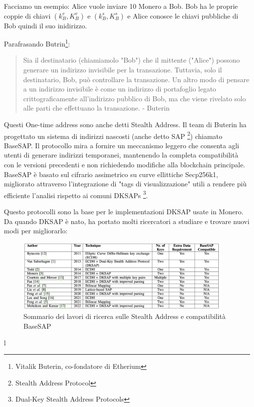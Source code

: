 \documentclass[12pt,a4paper]{article}
\begin{document}
Facciamo un esempio: Alice vuole inviare 10 Monero a Bob. Bob ha le proprie
coppie di chiavi $(k^v_B, K^v_B)$ e $(k^s_B, K^s_B)$ e Alice conosce le chiavi
pubbliche di Bob quindi il suo inidirizzo.

Parafrasando Butrin\footnote{Vitalik Buterin, co-fondatore di Etherium}:
\begin{quote}
    Sia il destinatario (chiamiamolo "Bob") che il mittente ("Alice") possono
    generare un indirizzo invisibile per la transazione. Tuttavia, solo il
    destinatario, Bob, può controllare la transazione. Un altro modo di pensare
    a un indirizzo invisibile è come un indirizzo di portafoglio legato
    crittograficamente all’indirizzo pubblico di Bob, ma che viene rivelato solo
    alle parti che effettuano la transazione. - Buterin \cite{Buterin Quote}
\end{quote}

Questi One-time address sono anche detti Stealth Address. Il team di Buterin ha
progettato un sistema di indirizzi nascosti (anche detto SAP \footnote{Stealth
Address Protocol}) chiamato BaseSAP. Il protocollo mira a fornire un meccanismo
leggero che consenta agli utenti di generare indirizzi temporanei, mantenendo la
completa compatibilità con le versioni precedenti e non richiedendo modifiche
alla blockchain principale. BaseSAP è basato sul cifrario assimetrico su curve
ellittiche Secp256k1, migliorato attraverso l'integrazione di "tags di
visualizzazione" utili a rendere più efficiente l'analisi rispetto ai comuni
DKSAPs \footnote{Dual-Key Stealth Address Protocols}.

Questo protocolli sono la base per le implementazioni DKSAP usate in Monero. Da
quando DKSAP è nato, ha portato molti ricercatori a studiare e trovare nuovi
modi per migliorarlo:

\begin{figure}[ht]
    \centering
    \includegraphics[width=0.95\textwidth]{./images/sommario.png}
    \caption{Sommario dei lavori di ricerca sulle Stealth Address e compatibilità BaseSAP}
    \label{fig:summary}
\end{figure}l
\end{document}
